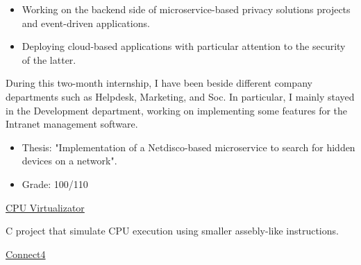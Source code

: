 \documentclass[10pt,a4paper,ragged2e,withhyper]{altacv}
\begin{document}
\begin{paracol}{2}

\begin{itemize}
\item Working on the backend side of microservice-based privacy solutions projects and event-driven applications.
\item Deploying cloud-based applications with particular attention to the security of the latter.
\end{itemize}
\medskip

\par
During this two-month internship, I have been beside different company departments such as Helpdesk, Marketing, and Soc. In particular, I mainly stayed in the Development department, working on implementing some features for the Intranet management software.

\begin{flushleft}
\end{flushleft}


\begin{itemize}
    \item Thesis: "Implementation of a Netdisco-based microservice to search for hidden devices on a network".
    \item Grade: 100/110
\end{itemize}

\begin{flushleft}
\end{flushleft}


\faGithub\href{https://github.com/faccimatteo/CPU-Virtualizator}{CPU Virtualizator}
\par
C project that simulate CPU execution using smaller assebly-like instructions.
\medskip

\faGithub\href{https://github.com/faccimatteo/Connect4}{Connect4}
\par


\end{paracol}
\end{document}
